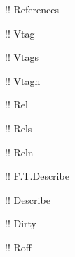\documentclass[10pt,a4paper]{article}
\begin{document}
\ttfamily
!\gitReferences ! References

!\gitVtag ! Vtag

!\gitVtags ! Vtags

!\gitVtagn ! Vtagn

!\gitRel ! Rel

!\gitRels ! Rels

!\gitReln ! Reln

!\gitFirstTagDescribe ! F.T.Describe

!\gitDescribe ! Describe

!\gitDirty ! Dirty

!\gitRoff ! Roff
\end{document}

